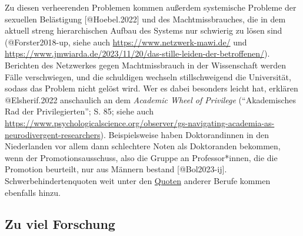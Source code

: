 \documentclass[
  letterpaper,
  DIV=11,
  numbers=noendperiod]{scrreprt}
\begin{document}
Zu diesen verheerenden Problemen kommen außerdem systemische Probleme
der sexuellen Belästigung {[}@Hoebel.2022{]} und des Machtmissbrauches,
die in dem aktuell streng hierarchischen Aufbau des Systems nur
schwierig zu lösen sind (@Forster2018-up, siehe auch
\url{https://www.netzwerk-mawi.de/} und
\url{https://www.jmwiarda.de/2023/11/20/das-stille-leiden-der-betroffenen/}).
Berichten des Netzwerkes gegen Machtmissbrauch in der Wissenschaft
werden Fälle verschwiegen, und die schuldigen wechseln stillschweigend
die Universität, sodass das Problem nicht gelöst wird. Wer es dabei
besonders leicht hat, erklären @Elsherif.2022 anschaulich an dem
\emph{Academic Wheel of Privilege} (``Akademisches Rad der
Privilegierten''; S. 85; siehe auch
\url{https://www.psychologicalscience.org/observer/gs-navigating-academia-as-neurodivergent-researchers}).
Beispielsweise haben Doktorandinnen in den Niederlanden vor allem dann
schlechtere Noten als Doktoranden bekommen, wenn der
Promotionsausschuss, also die Gruppe an Professor*innen, die die
Promotion beurteilt, nur aus Männern bestand {[}@Bol2023-ij{]}.
Schwerbehindertenquoten weit unter den
\href{https://www.laborjournal.de/rubric/essays/essays2023/e23_09.php}{Quoten}
anderer Berufe kommen ebenfalls hinzu.

\subsection{\texorpdfstring{\textbf{Zu viel
Forschung}}{Zu viel Forschung}}\label{zu-viel-forschung}
\end{document}
